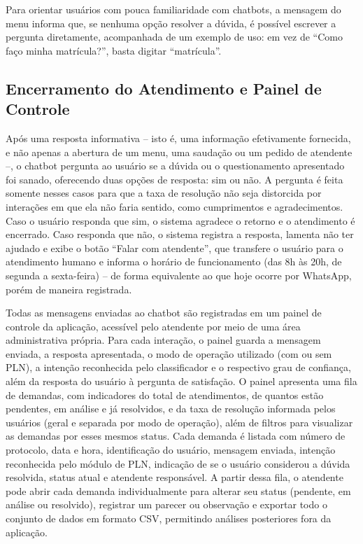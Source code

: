 \documentclass[12pt]{article}
\begin{document}
Para orientar usuários com pouca familiaridade com chatbots, a mensagem do
menu informa que, se nenhuma opção resolver a dúvida, é possível escrever
a pergunta diretamente, acompanhada de um exemplo de uso: em vez de ``Como
faço minha matrícula?'', basta digitar ``matrícula''.

\subsection{Encerramento do Atendimento e Painel de Controle}

Após uma resposta informativa -- isto é, uma informação efetivamente
fornecida, e não apenas a abertura de um menu, uma saudação ou um pedido
de atendente --, o chatbot pergunta ao usuário se a dúvida ou o
questionamento apresentado foi sanado, oferecendo duas opções de resposta:
sim ou não. A pergunta é feita somente nesses casos para que a taxa de
resolução não seja distorcida por interações em que ela não faria sentido,
como cumprimentos e agradecimentos. Caso o usuário responda que sim, o
sistema agradece o retorno e o atendimento é encerrado. Caso responda que
não, o sistema registra a resposta, lamenta não ter ajudado e exibe o
botão ``Falar com atendente'', que transfere o usuário para o atendimento
humano e informa o horário de funcionamento (das 8h às 20h, de segunda a
sexta-feira) -- de forma equivalente ao que hoje ocorre por WhatsApp,
porém de maneira registrada.

Todas as mensagens enviadas ao chatbot são registradas em um painel de
controle da aplicação, acessível pelo atendente por meio de uma área
administrativa própria. Para cada interação, o painel guarda a mensagem
enviada, a resposta apresentada, o modo de operação utilizado (com ou sem
PLN), a intenção reconhecida pelo classificador e o respectivo grau de
confiança, além da resposta do usuário à pergunta de satisfação. O painel
apresenta uma fila de demandas, com indicadores do total de atendimentos,
de quantos estão pendentes, em análise e já resolvidos, e da taxa de
resolução informada pelos usuários (geral e separada por modo de
operação), além de filtros para visualizar as demandas por esses mesmos
status. Cada demanda é listada com número de protocolo, data e hora,
identificação do usuário, mensagem enviada, intenção reconhecida pelo
módulo de PLN, indicação de se o usuário considerou a dúvida resolvida,
status atual e atendente responsável. A partir dessa fila, o atendente
pode abrir cada demanda individualmente para alterar seu status (pendente,
em análise ou resolvido), registrar um parecer ou observação e exportar
todo o conjunto de dados em formato CSV, permitindo análises posteriores
fora da aplicação.
\end{document}
